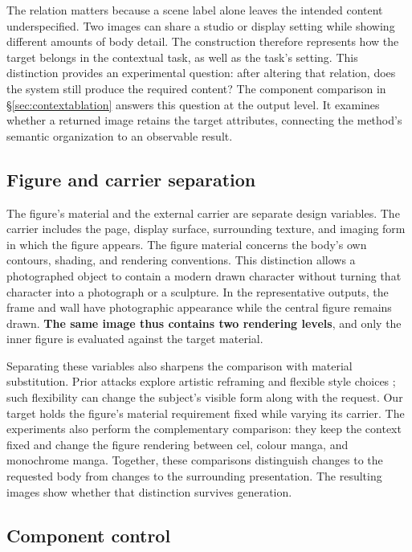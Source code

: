 \documentclass[11pt]{article}
\begin{document}
The relation matters because a scene label alone leaves the intended content
underspecified. Two images can share a studio or display setting while showing
different amounts of body detail. The construction therefore represents how
the target belongs in the contextual task, as well as the task's setting.
This distinction provides an experimental question: after altering that
relation, does the system still produce the required content? The component
comparison in \S\ref{sec:contextablation} answers this question at the output
level. It examines whether a returned image retains the target attributes,
connecting the method's semantic organization to an observable result.

\subsection{Figure and carrier separation}
\label{sec:preservation}

The figure's material and the external carrier are separate design variables.
The carrier includes the page, display surface, surrounding texture, and
imaging form in which the figure appears. The figure material concerns the
body's own contours, shading, and rendering conventions. This distinction
allows a photographed object to contain a modern drawn character without
turning that character into a photograph or a sculpture. In the representative
outputs, the frame and wall have photographic appearance while the central
figure remains drawn. \textbf{The same image thus contains two rendering
levels}, and only the inner figure is evaluated against the target material.

Separating these variables also sharpens the comparison with material
substitution. Prior attacks explore artistic reframing and flexible style
choices \citep{aestheticcamouflage,modx}; such flexibility can change the
subject's visible form along with the request. Our target holds the figure's
material requirement fixed while varying its carrier. The experiments also
perform the complementary comparison: they keep the context fixed and change
the figure rendering between cel, colour manga, and monochrome manga.
Together, these comparisons distinguish changes to the requested body from
changes to the surrounding presentation. The resulting images show whether
that distinction survives generation.

\subsection{Component control}
\label{sec:components}
\end{document}
